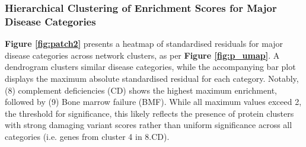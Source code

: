 \subsubsection{Hierarchical Clustering of Enrichment Scores for Major Disease Categories}
\textbf{Figure \ref{fig:patch2}} presents a heatmap of standardised residuals for major disease categories across network clusters, as per \textbf{Figure \ref{fig:p_umap}}. A dendrogram clusters similar disease categories, while the accompanying bar plot displays the maximum absolute standardised residual for each category.
Notably, (8) complement deficiencies (CD) shows the highest maximum enrichment, followed by 
(9) Bone marrow failure (BMF). While all maximum values exceed 2, the threshold for significance, this likely reflects the presence of protein clusters with strong damaging variant scores rather than uniform significance across all categories (i.e. genes from cluster 4 in 8.CD).

